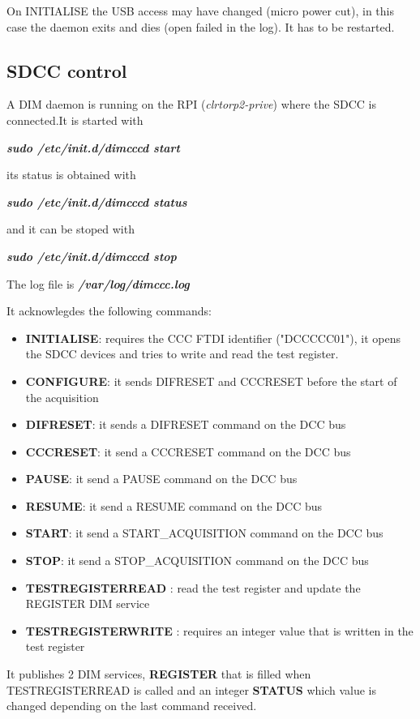 \documentclass[english]{article}
\begin{document}
On INITIALISE the USB access may have changed (micro power cut), in this case the daemon exits and dies (open failed in the log).  It has to be restarted.

\subsection{SDCC control}

A DIM daemon is running on the RPI ({\sl clrtorp2-prive}) where the SDCC is connected.It is started with

{\sl \bf sudo /etc/init.d/dimcccd start }

its status is obtained with 

{\sl \bf sudo /etc/init.d/dimcccd status }

and it can be stoped with

{\sl \bf sudo /etc/init.d/dimcccd stop }
 
 The log file is {\sl \bf /var/log/dimccc.log }
 
 It acknowlegdes the following commands:
 \begin{itemize}
\item {\bf INITIALISE}: requires the CCC FTDI identifier ("DCCCCC01"), it opens the SDCC devices and tries to write and read the test register. 
\item {\bf CONFIGURE}: it sends DIFRESET and CCCRESET before the start of the acquisition
\item {\bf DIFRESET}: it sends a DIFRESET command on the DCC bus
\item {\bf CCCRESET}: it send a CCCRESET command on the DCC bus
\item {\bf PAUSE}: it send a PAUSE command on the DCC bus
\item {\bf RESUME}: it send a RESUME command on the DCC bus
\item {\bf START}: it send a START\_ACQUISITION command on the DCC bus
\item {\bf STOP}: it send a STOP\_ACQUISITION command on the DCC bus
\item { \bf TESTREGISTERREAD }: read the test register and update the REGISTER DIM service
\item { \bf TESTREGISTERWRITE }: requires an integer value that is written in the test register
\end{itemize}

It publishes 2 DIM services, {\bf REGISTER} that is filled when TESTREGISTERREAD is called and an integer {\bf STATUS} which value is changed depending on the last command received.
 
\end{document}
